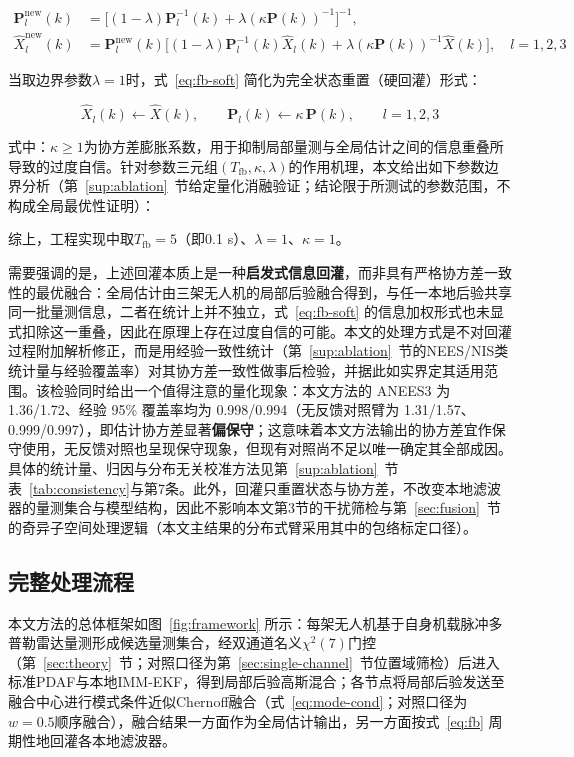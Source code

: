 \documentclass[UTF8,a4paper,zihao=-4]{ctexart}
\begin{document}
\begin{equation}
\begin{aligned}
\boldsymbol{P}_l^{\mathrm{new}}(k)&=\bigl[(1-\lambda)\boldsymbol{P}_l^{-1}(k)+\lambda(\kappa\boldsymbol{P}(k))^{-1}\bigr]^{-1},\\
\hat{X}_l^{\mathrm{new}}(k)&=\boldsymbol{P}_l^{\mathrm{new}}(k)\bigl[(1-\lambda)\boldsymbol{P}_l^{-1}(k)\hat{X}_l(k)+\lambda(\kappa\boldsymbol{P}(k))^{-1}\hat{X}(k)\bigr],\quad l=1,2,3
\end{aligned}
\label{eq:fb-soft}
\end{equation}

当取边界参数\(\lambda=1\)时，式~\eqref{eq:fb-soft} 简化为完全状态重置（硬回灌）形式：

\begin{equation}
\hat{X}_l(k)\leftarrow \hat{X}(k),\qquad \boldsymbol{P}_l(k)\leftarrow \kappa\,\boldsymbol{P}(k),\qquad l=1,2,3
\label{eq:fb}
\end{equation}

式中：\(\kappa\ge1\)为协方差膨胀系数，用于抑制局部量测与全局估计之间的信息重叠所导致的过度自信。针对参数三元组\((T_{\mathrm{fb}},\kappa,\lambda)\)的作用机理，本文给出如下参数边界分析（第~\ref{sup:ablation}~节给定量化消融验证；结论限于所测试的参数范围，不构成全局最优性证明）：

综上，工程实现中取\(T_{\mathrm{fb}}=5\)（即0.1 s）、\(\lambda=1\)、\(\kappa=1\)。

需要强调的是，上述回灌本质上是一种\textbf{启发式信息回灌}，而非具有严格协方差一致性的最优融合：全局估计由三架无人机的局部后验融合得到，与任一本地后验共享同一批量测信息，二者在统计上并不独立，式~\eqref{eq:fb-soft} 的信息加权形式也未显式扣除这一重叠，因此在原理上存在过度自信的可能。本文的处理方式是不对回灌过程附加解析修正，而是用经验一致性统计（第~\ref{sup:ablation}~节的NEES/NIS类统计量与经验覆盖率）对其协方差一致性做事后检验，并据此如实界定其适用范围。该检验同时给出一个值得注意的量化现象：本文方法的 ANEES3 为 1.36/1.72、经验 95\% 覆盖率均为 0.998/0.994（无反馈对照臂为 1.31/1.57、0.999/0.997），即估计协方差显著\textbf{偏保守}；这意味着本文方法输出的协方差宜作保守使用，无反馈对照也呈现保守现象，但现有对照尚不足以唯一确定其全部成因。具体的统计量、归因与分布无关校准方法见第~\ref{sup:ablation}~节表~\ref{tab:consistency}与第7条。此外，回灌只重置状态与协方差，不改变本地滤波器的量测集合与模型结构，因此不影响本文第3节的干扰筛检与第~\ref{sec:fusion}~节的奇异子空间处理逻辑（本文主结果的分布式臂采用其中的包络标定口径）。



\subsection{完整处理流程}\label{sec:flow}
本文方法的总体框架如图~\ref{fig:framework} 所示：每架无人机基于自身机载脉冲多普勒雷达量测形成候选量测集合，经双通道名义\(\chi^2(7)\)门控（第~\ref{sec:theory}~节；对照口径为第~\ref{sec:single-channel}~节位置域筛检）后进入标准PDAF与本地IMM-EKF，得到局部后验高斯混合；各节点将局部后验发送至融合中心进行模式条件近似Chernoff融合（式~\eqref{eq:mode-cond}；对照口径为$w=0.5$顺序融合），融合结果一方面作为全局估计输出，另一方面按式~\eqref{eq:fb} 周期性地回灌各本地滤波器。
\end{document}
